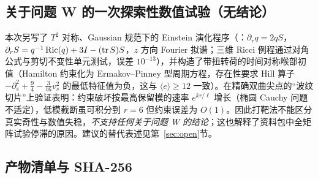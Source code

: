 \subsection{关于问题 W 的一次探索性数值试验（无结论）}
本次另写了 $T^2$ 对称、Gaussian 规范下的 Einstein 演化程序（：$\partial_rq=2qS$，$\partial_rS=q^{-1}\operatorname{Ric}(q)+3I-(\operatorname{tr} S)S$，$z$ 方向 Fourier 拟谱；三维 Ricci 例程通过对角公式与剪切不变性单元测试，误差 $10^{-13}$），并构造了带扭转荷的时间对称喉部初值（Hamilton 约束化为 Ermakov--Pinney 型周期方程，存在性要求 Hill 算子 $-\partial_s^2+\frac94-\frac3{16}v_s^2$ 的最低特征值为负，这与 $\langle e\rangle\ge12$ 一致）。在精确双曲尖点的“波纹切片”上验证表明：约束破坏按最高保留模的速率 $e^{kr/\ell}$ 增长（椭圆 Cauchy 问题不适定），低模截断虽可积分到 $r=6$ 但约束误差为 $O(1)$。因此打靶法不能区分真实奇性与数值失稳，\emph{不支持任何关于问题 W 的结论}；这也解释了资料包中全矩阵试验停滞的原因。建议的替代表述见第~\ref{sec:open}节。

\subsection{产物清单与 SHA-256}

